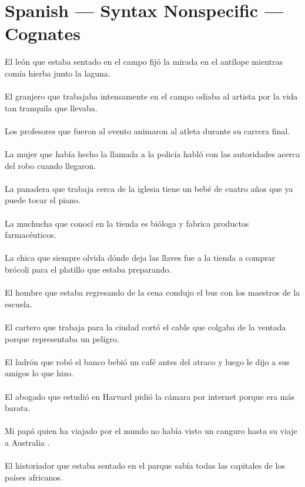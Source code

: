 \section{Spanish --- Syntax Nonspecific --- Cognates}
El le\'{o}n que estaba sentado en el campo fij\'{o} la mirada en el ant\'{i}lope mientras com\'{i}a hierba junto la laguna.	\\	\\
El granjero que trabajaba intensamente en el campo odiaba al artista por la vida tan tranquila que llevaba.	\\	\\
Los profesores que fueron al evento animaron al atleta durante su carrera final.	\\	\\
La mujer que hab\'{i}a hecho la llamada a la polic\'{i}a habl\'{o} con las autoridades acerca del robo cuando llegaron.	\\	\\
La panadera que trabaja cerca de la iglesia tiene un bebé de cuatro a\~{n}os que ya puede tocar el piano.	\\	\\
La muchucha que conoc\'{i} en la tienda es bi\'{o}loga y fabrica productos farmacéuticos.	\\	\\
La chica que siempre olvida d\'{o}nde deja las llaves fue a la tienda a comprar br\'{o}coli para el platillo que estaba preparando.	\\	\\
El hombre que estaba regresando de la cena condujo el bus con los maestros de la escuela.	\\	\\
El cartero que trabaja para la ciudad cort\'{o} el cable que colgaba de la ventada porque representaba un peligro.	\\	\\
El ladr\'{o}n que rob\'{o} el banco bebi\'{o} un café antes del atraco y luego le dijo a sus amigos lo que hizo.	\\	\\
El abogado que estudi\'{o} en Harvard pidi\'{o} la c\'{a}mara por internet porque era m\'{a}s barata.	\\	\\
Mi pap\'{a} quien ha viajado por el mundo no hab\'{i}a visto un canguro hasta su viaje a Australia .	\\	\\
El historiador que estaba sentado en el parque sab\'{i}a todas las capitales de los pa\'{i}ses africanos.	\\	\\
